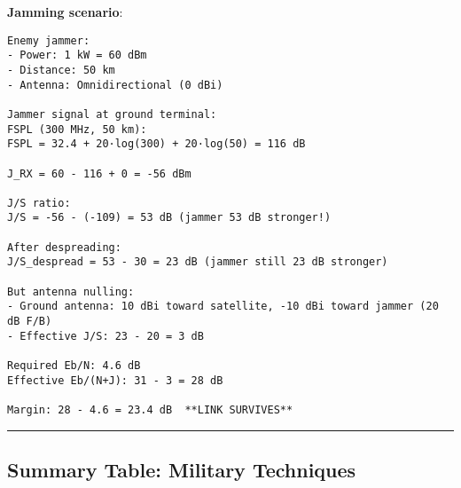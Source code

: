 \textbf{Jamming scenario}:

\begin{verbatim}
Enemy jammer:
- Power: 1 kW = 60 dBm
- Distance: 50 km
- Antenna: Omnidirectional (0 dBi)

Jammer signal at ground terminal:
FSPL (300 MHz, 50 km):
FSPL = 32.4 + 20·log(300) + 20·log(50) = 116 dB

J_RX = 60 - 116 + 0 = -56 dBm

J/S ratio:
J/S = -56 - (-109) = 53 dB (jammer 53 dB stronger!)

After despreading:
J/S_despread = 53 - 30 = 23 dB (jammer still 23 dB stronger)

But antenna nulling:
- Ground antenna: 10 dBi toward satellite, -10 dBi toward jammer (20 dB F/B)
- Effective J/S: 23 - 20 = 3 dB

Required Eb/N: 4.6 dB
Effective Eb/(N+J): 31 - 3 = 28 dB

Margin: 28 - 4.6 = 23.4 dB  **LINK SURVIVES**
\end{verbatim}

\begin{center}\rule{0.5\linewidth}{0.5pt}\end{center}

\subsection{\texorpdfstring{ Summary Table: Military
Techniques}{ Summary Table: Military Techniques}}\label{summary-table-military-techniques}

